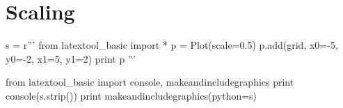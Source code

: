 \section{Scaling}

\begin{python}
s = r'''
from latextool_basic import *
p = Plot(scale=0.5)
p.add(grid, x0=-5, y0=-2, x1=5, y1=2)
print p
'''

from latextool_basic import console, makeandincludegraphics
print console(s.strip())
print makeandincludegraphics(python=s)
\end{python}
